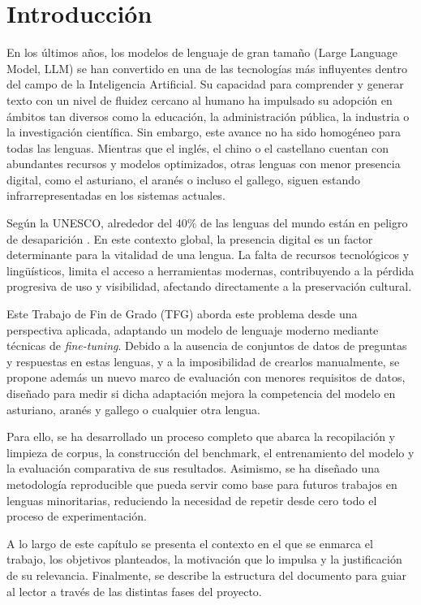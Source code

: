 \chapter{Introducción}
\label{ch:introduccion}

En los últimos años, los modelos de lenguaje de gran tamaño (Large Language Model, LLM) se han convertido en una de las tecnologías más influyentes dentro del campo de la Inteligencia Artificial. Su capacidad para comprender y generar texto con un nivel de fluidez cercano al humano ha impulsado su adopción en ámbitos tan diversos como la educación, la administración pública, la industria o la investigación científica. Sin embargo, este avance no ha sido homogéneo para todas las lenguas. Mientras que el inglés, el chino o el castellano cuentan con abundantes recursos y modelos optimizados, otras lenguas con menor presencia digital, como el asturiano, el aranés o incluso el gallego, siguen estando infrarrepresentadas en los sistemas actuales.

Según la UNESCO, alrededor del 40\% de las lenguas del mundo están en peligro de desaparición \cite{unesco_idil_languages}. En este contexto global, la presencia digital es un factor determinante para la vitalidad de una lengua. La falta de recursos tecnológicos y lingüísticos, limita el acceso a herramientas modernas, contribuyendo a la pérdida progresiva de uso y visibilidad, afectando directamente a la preservación cultural.

Este Trabajo de Fin de Grado (TFG) aborda este problema desde una perspectiva aplicada, adaptando un modelo de lenguaje moderno mediante técnicas de \textit{fine-tuning}. Debido a la ausencia de conjuntos de datos de preguntas y respuestas en estas lenguas, y a la imposibilidad de crearlos manualmente, se propone además un nuevo marco de evaluación con menores requisitos de datos, diseñado para medir si dicha adaptación mejora la competencia del modelo en asturiano, aranés y gallego o cualquier otra lengua.

Para ello, se ha desarrollado un proceso completo que abarca la recopilación y limpieza de corpus, la construcción del benchmark, el entrenamiento del modelo y la evaluación comparativa de sus resultados. Asimismo, se ha diseñado una metodología reproducible que pueda servir como base para futuros trabajos en lenguas minoritarias, reduciendo la necesidad de repetir desde cero todo el proceso de experimentación.

A lo largo de este capítulo se presenta el contexto en el que se enmarca el trabajo, los objetivos planteados, la motivación que lo impulsa y la justificación de su relevancia. Finalmente, se describe la estructura del documento para guiar al lector a través de las distintas fases del proyecto.


